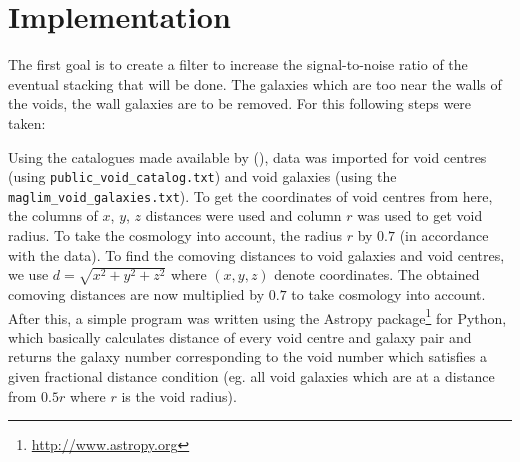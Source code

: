\section{Implementation}
The first goal is to create a filter to increase the signal-to-noise ratio of the eventual stacking that will be done. The galaxies which are too near the walls of the voids, the wall galaxies are to be removed. For this following steps were taken:
\par 
Using the catalogues made available by \citeauthor{pan_cosmic_2012} (\cite*{pan_cosmic_2012}), data was imported for void centres (using \verb|public_void_catalog.txt|) and void galaxies (using the \newline \verb|maglim_void_galaxies.txt|). To get the coordinates of void centres from here, the columns of $ x $, $ y $, $ z $ distances were used and column $ r $ was used to get void radius. To take the cosmology into account, the radius $ r $ by $ 0.7 $ (in accordance with the data). To find the comoving distances to void galaxies and void centres, we use $ d = \sqrt{x^2 + y^2 + z^2} $ where $ (x, y, z) $ denote coordinates. The obtained comoving distances are now multiplied by $ 0.7 $ to take cosmology into account. After this, a simple program was written using the Astropy package\footnote{\url{http://www.astropy.org}} for Python, which basically calculates distance of every void centre and galaxy pair and returns the galaxy number corresponding to the void number which satisfies a given fractional distance condition (eg. all void galaxies which are at a distance from $ 0.5r $ where $ r $ is the void radius).
